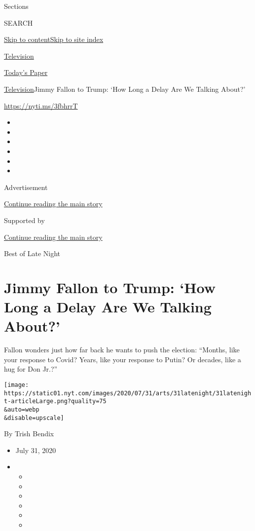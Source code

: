 Sections

SEARCH

\protect\hyperlink{site-content}{Skip to
content}\protect\hyperlink{site-index}{Skip to site index}

\href{https://www.nytimes.com/section/arts/television}{Television}

\href{https://myaccount.nytimes.com/auth/login?response_type=cookie\&client_id=vi}{}

\href{https://www.nytimes.com/section/todayspaper}{Today's Paper}

\href{/section/arts/television}{Television}\textbar{}Jimmy Fallon to
Trump: `How Long a Delay Are We Talking About?'

\url{https://nyti.ms/3fbhrrT}

\begin{itemize}
\item
\item
\item
\item
\item
\item
\end{itemize}

Advertisement

\protect\hyperlink{after-top}{Continue reading the main story}

Supported by

\protect\hyperlink{after-sponsor}{Continue reading the main story}

Best of Late Night

\hypertarget{jimmy-fallon-to-trump-how-long-a-delay-are-we-talking-about}{%
\section{Jimmy Fallon to Trump: `How Long a Delay Are We Talking
About?'}\label{jimmy-fallon-to-trump-how-long-a-delay-are-we-talking-about}}

Fallon wonders just how far back he wants to push the election:
``Months, like your response to Covid? Years, like your response to
Putin? Or decades, like a hug for Don Jr.?''

\texttt{[image: https://static01.nyt.com/images/2020/07/31/arts/31latenight/31latenight-articleLarge.png?quality=75\\\&auto=webp\\\&disable=upscale]}

By Trish Bendix

\begin{itemize}
\item
  July 31, 2020
\item
  \begin{itemize}
  \item
  \item
  \item
  \item
  \item
  \item
  \end{itemize}
\end{itemize}

